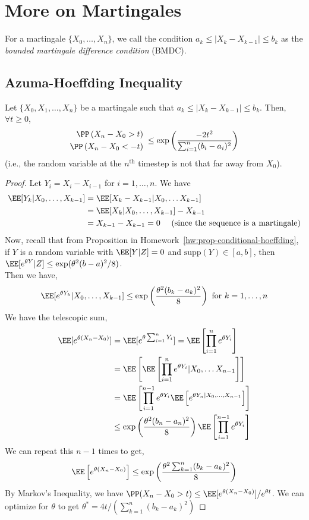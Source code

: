 \chapter{More on Martingales}
\begin{remark}
For a martingale $\{X_0, \dots, X_n\}$, we call the condition $a_k \leq |X_k - X_{k-1}| \leq b_k$ as the \textit{bounded martingale difference condition} (BMDC).
\end{remark}
\section{Azuma-Hoeffding Inequality}
\begin{theorem}
Let $\{X_0, X_1, \dots, X_n\}$ be a martingale such that $a_k \leq |X_k - X_{k-1}| \leq b_k$. Then, $\forall t \geq 0$, 
\begin{equation}
\begin{split}
    \PP\left(X_n - X_0 > t\right)& \\
    \PP\left(X_n - X_0 < -t\right)
\end{split}
\; \leq \exp\left(
\frac{-2t^2}{\sum_{i=1}^n (b_i - a_i)^2}\right)
\end{equation}
(i.e., the random variable at the $n^\text{th}$ timestep is not that far away from $X_0$).
\end{theorem}
\begin{proof}
Let $Y_i = X_i - X_{i-1}$ for $i = 1, \dots, n$. We have
\begin{align*}
    \EE[Y_k | X_0, \dots, X_{k-1}] &= \EE[X_{k} - X_{k-1} | X_0, \dots X_{k-1}] \\
    &= \EE[X_k | X_0, \dots, X_{k-1}] - X_{k-1} \\
    &= X_{k-1} - X_{k-1} = 0 \quad \text{ (since the sequence is a martingale)}
\end{align*} 
Now, recall that from Proposition in Homework~\ref{hw:prop-conditional-hoeffding}, if $Y$ is a random variable with $\EE[Y|Z] = 0$ and $\text{supp}(Y) \in [a,b]$, then $\EE[e^{\theta Y} | Z] \leq \exp(\theta^2(b-a)^2/8)$. \\
Then we have,
\[
\EE[e^{\theta Y_k} | X_0, \dots, X_{k-1}] \leq \exp\left(\frac{\theta^2(b_k -a_k)^2}{8}\right) \text{ for } k = 1, \dots, n\]
We have the telescopic sum, 
\begin{align*}
\EE[e^{\theta(X_n - X_0)}] &= \EE[{e^{\theta \sum_{i=1}^n Y_i}}] = \EE\left[\prod_{i=1}^n e^{\theta Y_i}\right] \\
&= \EE\left[\EE\left[\prod_{i=1}^{n} e^{\theta Y_i} | X_0 ,\dots X_{n-1}\right]\right] \\
&= \EE\left[\prod_{i=1}^{n-1}e^{\theta Y_i} \EE\left[e^{\theta Y_n | X_0, \dots, X_{n-1}}\right]\right] \\
&\leq \exp\left(\frac{\theta^2(b_n-a_n)^2}{8}\right) \EE\left[\prod_{i=1}^{n-1}e^{\theta Y_i}\right]
\end{align*}
We can repeat this $n-1$ times to get,
\[
\EE\left[{e^{\theta(X_n - X_0)}}\right] \leq \exp\left(\frac{\theta^2 \sum_{k=1}^n (b_k-a_k)^2}{8}\right)
\]
By Markov's Inequality, we have $\PP(X_n - X_0 > t) \leq \EE[e^{\theta (X_n - X_0)}]/e^{\theta t}$. We can optimize for $\theta$ to get $\theta^* = 4t/(\sum_{k=1}^n (b_k - a_k)^2)$
\end{proof}
